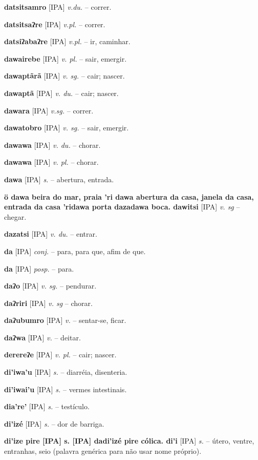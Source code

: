 \textbf{datsitsamro} [IPA] \textit{v.du.} -- correr.

\textbf{datsitsaʔre} [IPA] \textit{v.pl.} -- correr.

\textbf{datsiʔabaʔre} [IPA] \textit{v.pl.} -- ir, caminhar.

\textbf{dawairebe} [IPA] \textit{v. pl.} -- sair, emergir.

\textbf{dawaptãrã} [IPA] \textit{v. sg.} -- cair; nascer.

\textbf{dawaptã} [IPA] \textit{v. du.} -- cair; nascer.

\textbf{dawara} [IPA] \textit{v.sg.} -- correr.

\textbf{dawatobro} [IPA] \textit{v. sg.} -- sair, emergir.

\textbf{dawawa} [IPA] \textit{v. du.} -- chorar.

\textbf{dawawa} [IPA] \textit{v. pl.} -- chorar.

\textbf{dawa} [IPA] \textit{s.} -- abertura, entrada.

\textbf{ö dawa beira do mar, praia  'ri dawa abertura da casa, janela da casa, entrada da casa  'ridawa porta  dazadawa boca. dawitsi} [IPA] \textit{v. sg} -- chegar.

\textbf{dazatsi} [IPA] \textit{v. du.} -- entrar.

\textbf{da} [IPA] \textit{conj.} -- para, para que, afim de que.

\textbf{da} [IPA] \textit{posp.} -- para.

\textbf{daʔo} [IPA] \textit{v. sg.} -- pendurar.

\textbf{daʔriri} [IPA] \textit{v. sg} -- chorar.

\textbf{daʔubumro} [IPA] \textit{v.} -- sentar-se, ficar.

\textbf{daʔwa} [IPA] \textit{v.} -- deitar.

\textbf{derereʔe} [IPA] \textit{v. pl.} -- cair; nascer.

\textbf{di'iwa'u} [IPA] \textit{s.} -- diarréia, disenteria.

\textbf{di'iwai'u} [IPA] \textit{s.} -- vermes intestinais.

\textbf{dia're'} [IPA] \textit{s.} -- testículo. \href{https://xavante.pythonanywhere.com/static/dicionario/play.html?file=testicle.wav}{\faHeadphones}

\textbf{di'izé} [IPA] \textit{s.} -- dor de barriga.

\textbf{di'ize pire [IPA] s. [IPA] dadi'izé pire cólica. di'i} [IPA] \textit{s.} -- útero, ventre, entranhas, seio (palavra genérica para não usar nome próprio).

